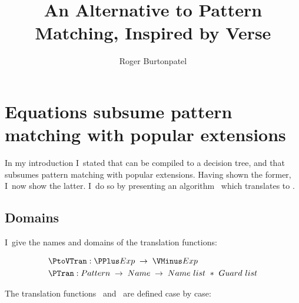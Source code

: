 \documentclass[manuscript,screen,review, 12pt, nonacm]{acmart}
\title{An Alternative to Pattern Matching, Inspired by Verse}
\author{Roger Burtonpatel}
\affiliation{%
\institution{Tufts University}
\streetaddress{419 Boston Ave}
  \city{Medford}
  \state{Massachusetts}
  \country{USA}
  \postcode{02155}
  }
\begin{document}
\section{Equations subsume pattern matching with popular extensions}
\label{pplustovminus}
    In my introduction I~stated that \VMinus can be compiled to a decision tree,
    and that \VMinus subsumes pattern matching with popular extensions. Having
    shown the former, I~now show the latter. I~do so by presenting an algorithm
    \PtoVTran\ which translates \PPlus to \VMinus. 
    

    \subsection{Domains}

    I~give the names and domains of the translation functions: 
    
    \begin{align*}
        &\PtoVTran: \PPlus Exp\; \rightarrow\; \VMinus Exp \\
        &\PTran: Pattern\; \rightarrow\; Name\; \rightarrow\; Name\ list\ *\ Guard\ list \\
    \end{align*}
    
    The translation functions \PtoVTran\ and \PTran\ are defined case by case: 
    
    
        
\end{document}
